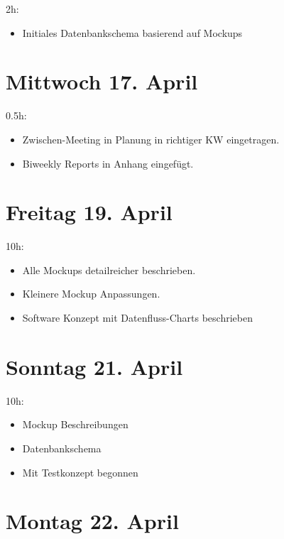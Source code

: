 2h:

\begin{itemize}
  \tightlist
  \item
        Initiales Datenbankschema basierend auf Mockups
\end{itemize}

\section{Mittwoch 17. April}\label{mittwoch-17.april}

0.5h:

\begin{itemize}
  \tightlist
  \item
        Zwischen-Meeting in Planung in richtiger KW eingetragen.
  \item
        Biweekly Reports in Anhang eingefügt.
\end{itemize}

\section{Freitag 19. April}\label{freitag-19.april}

10h:

\begin{itemize}
  \tightlist
  \item
        Alle Mockups detailreicher beschrieben.
  \item
        Kleinere Mockup Anpassungen.
  \item
        Software Konzept mit Datenfluss-Charts beschrieben
\end{itemize}

\section{Sonntag 21. April}\label{sonntag-21.april}

10h:

\begin{itemize}
  \tightlist
  \item
        Mockup Beschreibungen
  \item
        Datenbankschema
  \item
        Mit Testkonzept begonnen
\end{itemize}

\section{Montag 22. April}\label{montag-22.april}

